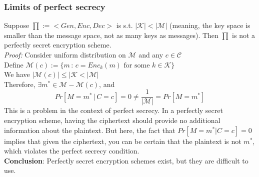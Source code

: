 \documentclass[11pt, oneside]{article}   	%
\begin{document}
\subsubsection{Limits of perfect secrecy}
Suppose $\prod:=<Gen,Enc,Dec>$ is s.t. $|\mathcal{K}| < |\mathcal{M}|$ (meaning, the key space is smaller than the message space, not as many keys as messages). Then $\prod$ is not a perfectly secret encryption scheme.\\
\emph{Proof:} Consider uniform distribution on $\mathcal{M}$ and any $c \in \mathcal{C}$\\
Define $\mathcal{M}(c):=\{m\,:\,c=Enc_k(m) \text{ for some } k \in \mathcal{K}\}$\\
We have $|\mathcal{M}(c)| \le |\mathcal{K} < |\mathcal{M}|$\\
Therefore, $\exists m^* \in \mathcal{M} - \mathcal{M}(c)$, and
\begin{equation}
Pr[M=m^*\,|\,C=c]=0 \neq \frac{1}{|\mathcal{M}|} = Pr[M=m^*]
\end{equation}
This is a problem in the context of perfect secrecy. In a perfectly secret encryption scheme, having the ciphertext should provide no additional information about the plaintext. But here, the fact that $Pr[M=m^*|C=c]=0$ implies that given the ciphertext, you can be certain that the plaintext is not $m^*$, which violates the perfect secrecy condition.\\
\textbf{Conclusion}: Perfectly secret encryption schemes exist, but they are difficult to use.
\end{document}
